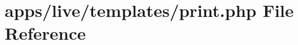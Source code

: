 \hypertarget{live_2templates_2print_8php}{\section{apps/live/templates/print.php File Reference}
\label{live_2templates_2print_8php}
}
